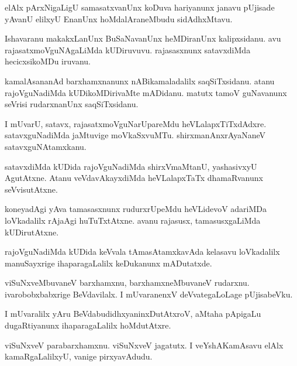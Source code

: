 \documentclass{article}
\begin{document}
\begin{mn}%
elAlx pArxNigaLigU samasatxvanUnx koDuva hariyanunx janavu pUjisade yAvanU elilxyU EnanUnx 
hoMdalAraneMbudu sidAdhxMtavu.
\end{mn}

\begin{mn}%
Ishavaranu makakxLanUnx BuSaNavanUnx heMDiranUnx kalipxsidanu. avu rajasatxmoVguNAgaLiMda 
kUDiruvuvu. rajasasxnunx satavxdiMda hecicxsikoMDu iruvanu.
\end{mn}

\begin{mn}%
kamalAsananAd barxhamxnanunx nABikamaladalilx saqSiTxsidanu. atanu rajoVguNadiMda 
kUDikoMDirivaMte mADidanu. matutx tamoV guNavanunx seVrisi rudarxnanUnx saqSiTxsidanu.
\end{mn}

\begin{mn}%
I mUvarU, satavx, rajasatxmoVguNarUpareMdu heVLalapxTiTxdAdxre. satavxguNadiMda jaMtuvige 
moVkaSxvuMTu. shirxmanAnxrAyaNaneV satavxguNAtamxkanu.
\end{mn}

\begin{mn}%
satavxdiMda kUDida rajoVguNadiMda shirxVmaMtanU, yashasivxyU AgutAtxne. Atanu 
veVdavAkayxdiMda heVLalapxTaTx dhamaRvanunx seVvisutAtxne.
\end{mn}

\begin{mn}%
koneyadAgi yAva tamasasxnunx rudurxrUpeMdu heVLidevoV adariMDa loVkadalilx rAjaAgi 
huTuTxtAtxne. avanu rajasusx, tamasusxgaLiMda kUDirutAtxne.
\end{mn}

\begin{mn}%
rajoVguNadiMda kUDida keVvala tAmasAtamxkavAda kelasavu loVkadalilx manuSayxrige 
ihaparagaLalilx keDukanunx mADutatxde.
\end{mn}

\begin{mn}%
viSuNxveMbuvaneV barxhamxnu, barxhamxneMbuvaneV rudarxnu. ivarobobxbabxrige BeVdavilalx. I 
mUvaranenxV deVvategaLoLage pUjisabeVku.
\end{mn}

\begin{mn}%
I mUvaralilx yAru  BeVdabudidhxyaninxDutAtxroV, aMtaha pApigaLu dugaRtiyanunx 
ihaparagaLalilx hoMdutAtxre.
\end{mn}

\begin{mn}%
viSuNxveV parabarxhamxnu. viSuNxveV jagatutx. I veYshAKamAsavu elAlx kamaRgaLalilxyU, 
vanige pirxyavAdudu.
\end{mn}
\end{document}
